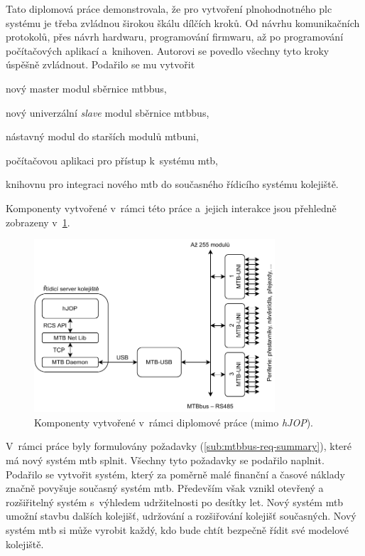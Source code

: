Tato diplomová práce demonstrovala, že pro vytvoření plnohodnotného \gls{plc}
systému je třeba zvládnou širokou škálu dílčích kroků. Od návrhu komunikačních
protokolů, přes návrh hardwaru, programování firmwaru, až po programování
počítačových aplikací a~knihoven. Autorovi se povedlo všechny tyto kroky
úspěšně zvládnout. Podařilo se mu vytvořit

\begin{compactitem}
\item nový master modul sběrnice \gls{mtbbus},
\item nový univerzální \textit{slave} modul sběrnice \gls{mtbbus},
\item nástavný modul do starších modulů \gls{mtbuni},
\item počítačovou aplikaci pro přístup k~systému \gls{mtb},
\item knihovnu pro integraci nového \gls{mtb} do současného řídicího systému
	kolejiště.
\end{compactitem}

Komponenty vytvořené v~rámci této práce a~jejich interakce jsou přehledně
zobrazeny v~\ref{fig:new-topology}.

\begin{figure}[ht]
\includegraphics[width=0.8\textwidth]{data/new-topology.pdf}
\caption{Komponenty vytvořené v~rámci diplomové práce (mimo \textit{hJOP}).}
\label{fig:new-topology}
\end{figure}

V~rámci práce byly formulovány požadavky (\ref{sub:mtbbus-req-summary}), které
má nový systém \gls{mtb} splnit. Všechny tyto požadavky se podařilo naplnit.
Podařilo se vytvořit systém, který za poměrně malé finanční a časové náklady
značně povyšuje současný systém \gls{mtb}. Především však vznikl otevřený
a rozšiřitelný systém s~výhledem udržitelnosti po desítky let. Nový systém
\gls{mtb} umožní stavbu dalších kolejišť, udržování a rozšiřování kolejišť
současných. Nový systém \gls{mtb} si může vyrobit každý, kdo bude chtít bezpečně
řídit své modelové kolejiště.

